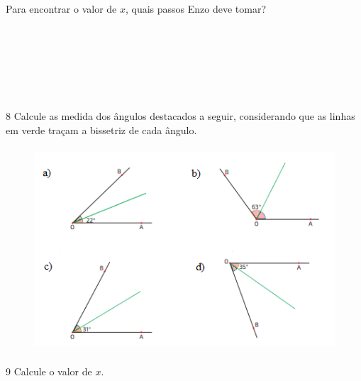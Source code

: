 Para encontrar o valor de $x$, quais passos Enzo deve tomar?

\\
\\
\\
\\
\\
\\



\num{8} Calcule as medida dos ângulos destacados a seguir, considerando que as
linhas em verde traçam a bissetriz de cada ângulo.

\begin{figure}[H]
\centering\includegraphics[width=4.66667in,height=3in]{./imgSAEB_8_MAT/media/image32.png}
\end{figure}



\num{9} Calcule o valor de $x$.

